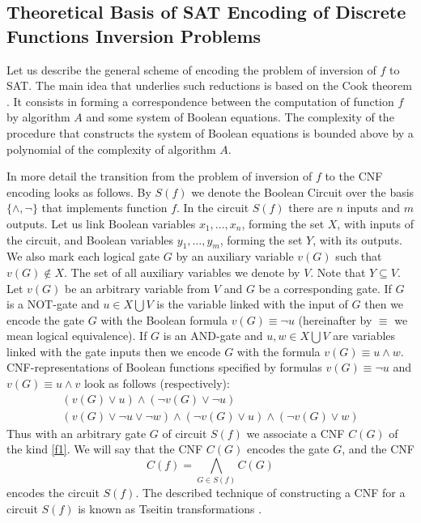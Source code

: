 \documentclass[runningheads,a4paper]{llncs}
\begin{document}
\subsection{Theoretical Basis of SAT Encoding of Discrete Functions Inversion Problems}

Let us describe the general scheme of encoding the problem of inversion of $f$ to SAT. The main idea that underlies such reductions is based on the Cook theorem \cite{DBLP:conf/stoc/Cook71}. It consists in forming a correspondence between the computation of function $f$ by algorithm $A$ and some system of Boolean equations. The complexity of the procedure that constructs the system of Boolean equations is bounded above by a polynomial of the complexity of algorithm $A$.

In more detail the transition from the problem of inversion of $f$ to the CNF encoding looks as follows. By $S(f)$ we denote the Boolean Circuit over the basis $\{\wedge,\neg\}$ that implements function $f$. In the circuit $S(f)$ there are $n$ inputs and $m$ outputs. Let us link Boolean variables $x_1,\ldots,x_n$, forming the set $X$, with inputs of the circuit, and Boolean variables $y_1,\ldots,y_m$, forming the set $Y$, with its outputs. We also mark each logical gate $G$ by an auxiliary variable $v(G)$ such that $v(G)\notin X$. The set of all auxiliary variables we denote by $V$. Note that $Y\subseteq V$. Let $v(G)$ be an arbitrary variable from $V$ and $G$ be a corresponding gate. If $G$ is a NOT-gate and $u\in X\bigcup V$ is the variable linked with the input of $G$ then we encode the gate $G$ with the Boolean formula $v(G)\equiv \neg u$ (hereinafter by $\equiv$ we mean logical equivalence). If $G$ is an AND-gate and $u,w\in X\bigcup V$ are variables linked with the gate inputs then we encode $G$ with the formula $v(G)\equiv u\wedge w$. CNF-representations of Boolean functions specified by formulas $v(G)\equiv \neg u$ and $v(G)\equiv u\wedge v$ look as follows (respectively):
\begin{equation}
\label{f1}
\begin{array}{l}
\left(v(G)\vee u\right)\wedge \left(\neg v(G)\vee \neg u\right)\\
\left(v(G)\vee \neg u\vee \neg w\right)\wedge \left(\neg v(G)\vee u \right)\wedge \left(\neg v(G)\vee w\right)
\end{array}
\end{equation}
Thus with an arbitrary gate $G$ of circuit $S(f)$ we associate a CNF $C(G)$ of the kind \eqref{f1}. We will say that the CNF $C(G)$ encodes the gate $G$, and the CNF 
\begin{equation*}
C(f)=\bigwedge\limits_{G\in S(f)}C(G)
\end{equation*}
encodes the circuit $S(f)$. The described technique of constructing a CNF for a circuit $S(f)$ is known as Tseitin transformations \cite{Tseitin83}. 
\end{document}

